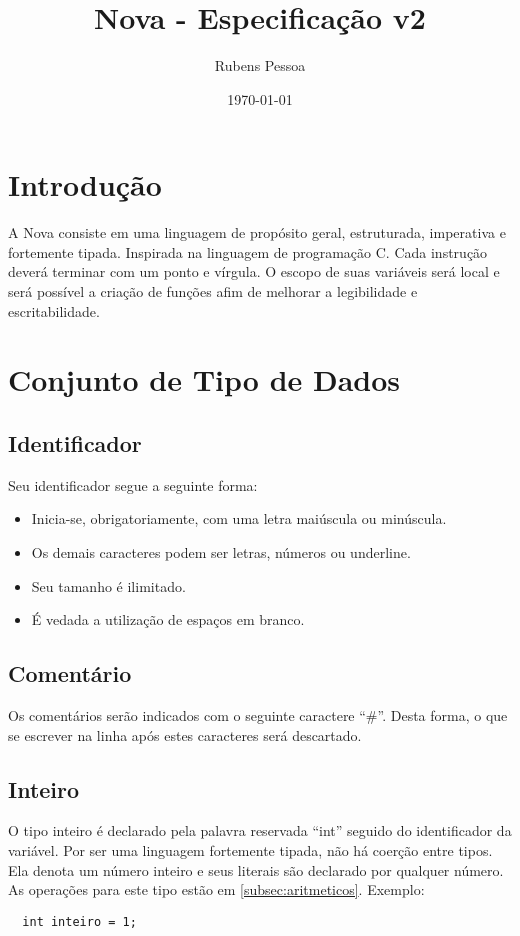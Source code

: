 \documentclass[a4paper, 12pt, article]{memoir}
\title{Nova - Especificação v2}
\author{Rubens Pessoa}
\date{\today}
\begin{document}
\frontmatter
\begin{titlingpage}
  \maketitle
\end{titlingpage}

\tableofcontents

\mainmatter

\section{Introdução}
\label{sec:intro}
A Nova consiste em uma linguagem de propósito geral, estruturada, imperativa e fortemente tipada. Inspirada na linguagem de programação C. Cada instrução deverá terminar com um ponto e vírgula. O escopo de suas variáveis será local e será possível a criação de funções afim de melhorar a legibilidade e escritabilidade. 

\section{Conjunto de Tipo de Dados}
\label{sec:conjunto}

\subsection{Identificador}
\label{subsec:id}
Seu identificador segue a seguinte forma:
\begin{itemize}
\item Inicia-se, obrigatoriamente, com uma letra maiúscula ou minúscula.
\item Os demais caracteres podem ser letras, números ou underline.
\item Seu tamanho é ilimitado.
\item É vedada a utilização de espaços em branco.
\end{itemize}

\subsection{Comentário}
\label{subsec:comentario}
Os comentários serão indicados com o seguinte caractere ``\#''. Desta forma, o que se escrever na linha após estes caracteres será descartado.

\subsection{Inteiro}
\label{subsec:inteiro}
O tipo inteiro é declarado pela palavra reservada ``int'' seguido do identificador da
variável. Por ser uma linguagem fortemente tipada, não há coerção entre tipos. Ela denota um número inteiro e seus literais são declarado por qualquer número. As operações para este tipo estão em \ref{subsec:aritmeticos}. Exemplo:
\begin{lstlisting}
  int inteiro = 1;
\end{lstlisting}
\end{document}
